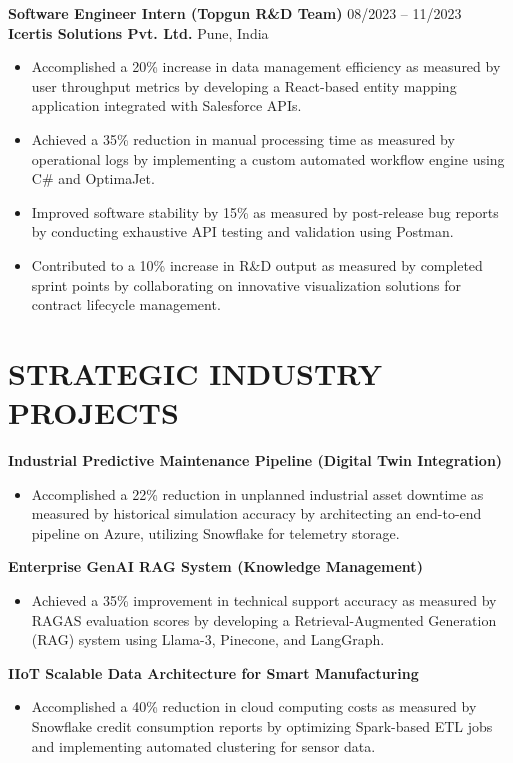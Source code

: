 \documentclass[10pt, a4paper]{article}
\begin{document}
\vspace{8pt}
\textbf{Software Engineer Intern (Topgun R\&D Team)} \hfill 08/2023 – 11/2023 \\
\textbf{Icertis Solutions Pvt. Ltd.} \hfill Pune, India
\begin{itemize}
    \item Accomplished a 20\% increase in data management efficiency as measured by user throughput metrics by developing a React-based entity mapping application integrated with Salesforce APIs.
    \item Achieved a 35\% reduction in manual processing time as measured by operational logs by implementing a custom automated workflow engine using C\# and OptimaJet.
    \item Improved software stability by 15\% as measured by post-release bug reports by conducting exhaustive API testing and validation using Postman.
    \item Contributed to a 10\% increase in R\&D output as measured by completed sprint points by collaborating on innovative visualization solutions for contract lifecycle management.
\end{itemize}

\section{STRATEGIC INDUSTRY PROJECTS}

\textbf{Industrial Predictive Maintenance Pipeline (Digital Twin Integration)}
\begin{itemize}
    \item Accomplished a 22\% reduction in unplanned industrial asset downtime as measured by historical simulation accuracy by architecting an end-to-end pipeline on Azure, utilizing Snowflake for telemetry storage.
\end{itemize}

\textbf{Enterprise GenAI RAG System (Knowledge Management)}
\begin{itemize}
    \item Achieved a 35\% improvement in technical support accuracy as measured by RAGAS evaluation scores by developing a Retrieval-Augmented Generation (RAG) system using Llama-3, Pinecone, and LangGraph.
\end{itemize}

\textbf{IIoT Scalable Data Architecture for Smart Manufacturing}
\begin{itemize}
    \item Accomplished a 40\% reduction in cloud computing costs as measured by Snowflake credit consumption reports by optimizing Spark-based ETL jobs and implementing automated clustering for sensor data.
\end{itemize}
\end{document}

